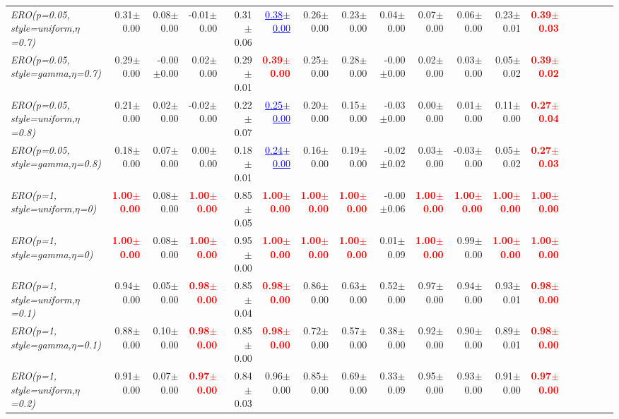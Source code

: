\documentclass[nohyperref]{article}
\theoremstyle{plain}
\theoremstyle{definition}
\theoremstyle{remark}
\newcommand{\red}[1]{\textcolor{red}{\textbf{#1}}}
\newcommand{\blue}[1]{\textcolor{blue}{\underline{#1}}}
\begin{document}
\begin{table*}[!ht]
{\begin{tabular}{lrrrrrrrrrrrrrrrrr}
			{\it ERO(p=0.05, style=uniform,$\eta$=0.7)} & 0.31$\pm$0.00 & 0.08$\pm$0.00 & -0.01$\pm$0.00 & 0.31$\pm$0.06 & \blue{0.38$\pm$0.00} & 0.26$\pm$0.00 & 0.23$\pm$0.00 & 0.04$\pm$0.00 & 0.07$\pm$0.00 & 0.06$\pm$0.00 & 0.23$\pm$0.01 & \red{0.39$\pm$0.03} \\
			{\it ERO(p=0.05, style=gamma,$\eta$=0.7)} & 0.29$\pm$0.00 & -0.00$\pm$0.00 & 0.02$\pm$0.00 & 0.29$\pm$0.01 & \red{0.39$\pm$0.00} & 0.25$\pm$0.00 & 0.28$\pm$0.00 & -0.00$\pm$0.00 & 0.02$\pm$0.00 & 0.03$\pm$0.00 & 0.05$\pm$0.02 & \red{0.39$\pm$0.02} \\
			{\it ERO(p=0.05, style=uniform,$\eta$=0.8)} & 0.21$\pm$0.00 & 0.02$\pm$0.00 & -0.02$\pm$0.00 & 0.22$\pm$0.07 & \blue{0.25$\pm$0.00} & 0.20$\pm$0.00 & 0.15$\pm$0.00 & -0.03$\pm$0.00 & 0.00$\pm$0.00 & 0.01$\pm$0.00 & 0.11$\pm$0.00 & \red{0.27$\pm$0.04} \\
			{\it ERO(p=0.05, style=gamma,$\eta$=0.8)} & 0.18$\pm$0.00 & 0.07$\pm$0.00 & 0.00$\pm$0.00 & 0.18$\pm$0.01 & \blue{0.24$\pm$0.00} & 0.16$\pm$0.00 & 0.19$\pm$0.00 & -0.02$\pm$0.02 & 0.03$\pm$0.00 & -0.03$\pm$0.00 & 0.05$\pm$0.02 & \red{0.27$\pm$0.03} \\
			{\it ERO(p=1, style=uniform,$\eta$=0)} & \red{1.00$\pm$0.00} & 0.08$\pm$0.00 & \red{1.00$\pm$0.00} & 0.85$\pm$0.05 & \red{1.00$\pm$0.00} & \red{1.00$\pm$0.00} & \red{1.00$\pm$0.00} & -0.00$\pm$0.06 & \red{1.00$\pm$0.00} & \red{1.00$\pm$0.00} & \red{1.00$\pm$0.00} & \red{1.00$\pm$0.00} \\
			{\it ERO(p=1, style=gamma,$\eta$=0)} & \red{1.00$\pm$0.00} & 0.08$\pm$0.00 & \red{1.00$\pm$0.00} & 0.95$\pm$0.00 & \red{1.00$\pm$0.00} & \red{1.00$\pm$0.00} & \red{1.00$\pm$0.00} & 0.01$\pm$0.09 & \red{1.00$\pm$0.00} & 0.99$\pm$0.00 & \red{1.00$\pm$0.00} & \red{1.00$\pm$0.00} \\
			{\it ERO(p=1, style=uniform,$\eta$=0.1)} & 0.94$\pm$0.00 & 0.05$\pm$0.00 & \red{0.98$\pm$0.00} & 0.85$\pm$0.04 & \red{0.98$\pm$0.00} & 0.86$\pm$0.00 & 0.63$\pm$0.00 & 0.52$\pm$0.00 & 0.97$\pm$0.00 & 0.94$\pm$0.00 & 0.93$\pm$0.01 & \red{0.98$\pm$0.00} \\
			{\it ERO(p=1, style=gamma,$\eta$=0.1)} & 0.88$\pm$0.00 & 0.10$\pm$0.00 & \red{0.98$\pm$0.00} & 0.85$\pm$0.00 & \red{0.98$\pm$0.00} & 0.72$\pm$0.00 & 0.57$\pm$0.00 & 0.38$\pm$0.00 & 0.92$\pm$0.00 & 0.90$\pm$0.00 & 0.89$\pm$0.01 & \red{0.98$\pm$0.00} \\
			{\it ERO(p=1, style=uniform,$\eta$=0.2)} & 0.91$\pm$0.00 & 0.07$\pm$0.00 & \red{0.97$\pm$0.00} & 0.84$\pm$0.03 & 0.96$\pm$0.00 & 0.85$\pm$0.00 & 0.69$\pm$0.00 & 0.33$\pm$0.09 & 0.95$\pm$0.00 & 0.93$\pm$0.00 & 0.91$\pm$0.00 & \red{0.97$\pm$0.00} \\

\end{tabular}}
\end{table*}
\end{document}

